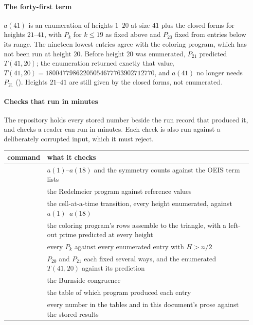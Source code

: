 \documentclass[11pt]{article}
\begin{document}
\paragraph{The forty-first term} $a(41)$ is an enumeration of heights
$1$--$20$ at size $41$ plus the closed forms for heights $21$--$41$, with
$P_k$ for $k \le 19$ as fixed above and $P_{20}$ fixed from entries below its
range. The nineteen lowest entries agree with the coloring program, which has
not been run at height $20$. Before height $20$ was enumerated, $P_{21}$
predicted $T(41,20)$; the enumeration returned exactly that value,
$T(41,20) = \num{18004779862205054677763902712770}$, and $a(41)$ no longer
needs $P_{21}$ (). Heights $21$--$41$ are
still given by the closed forms, not enumerated.

\paragraph{Checks that run in minutes} The repository holds every stored
number beside the run record that produced it, and checks a reader can run
in minutes. Each check is also run against a deliberately corrupted input,
which it must reject.

\begin{center}\small
\begin{tabular}{l R{0.5\textwidth}}
\toprule
command & what it checks \\
\midrule
{} & $a(1)$--$a(18)$ and the symmetry counts against the OEIS term lists \\
 & the Redelmeier program against reference values \\
 & the cell-at-a-time transition, every height enumerated, against $a(1)$--$a(18)$ \\
 & the coloring program's rows assemble to the triangle, with a left-out prime predicted at every height \\
 & every $P_k$ against every enumerated entry with $H > n/2$ \\
 & $P_{20}$ and $P_{21}$ each fixed several ways, and the enumerated $T(41,20)$ against its prediction \\
 & the Burnside congruence \\
 & the table of which program produced each entry \\
 & every number in the tables and in this document's prose against the stored results \\
\bottomrule
\end{tabular}
\end{center}
\end{document}
